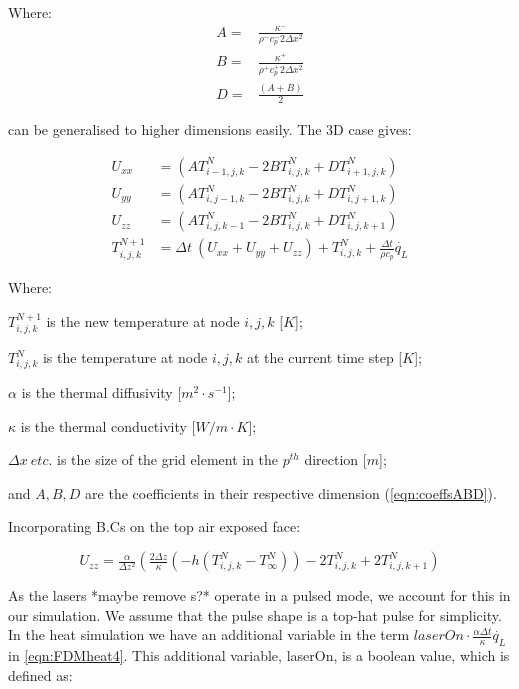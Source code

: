 Where:
\begin{align}
A=&\frac{\kappa^{-}}{\rho^{-}c_{p}^{-}2\Delta x^2} \nonumber \\
B=&\frac{\kappa^{+}}{\rho^{+}c_{p}^{+}2\Delta x^2} \label{eqn:coeffsABD}\\
D=&\frac{(A+B)}{2} \nonumber
\end{align}

 can be generalised to higher dimensions easily. The 3D case gives:

\begin{align}
U_{xx} &=  (A T^N_{i-1,j,k} - 2B T^N_{i,j,k} + D T^N_{i+1,j,k}) \label{eqn:FDMheat1}\\
U_{yy} &=  (A T^N_{i,j-1,k} - 2B T^N_{i,j,k} + D T^N_{i,j+1,k}) \label{eqn:FDMheat2}\\
U_{zz} &=  (A T^N_{i,j,k-1} - 2B T^N_{i,j,k} + D T^N_{i,j,k+1}) \label{eqn:FDMheat3}\\
T^{N+1}_{i,j,k} &= \Delta t\ (U_{xx} + U_{yy} + U_{zz}) + T^{N}_{i,j,k} + \tfrac{\Delta t}{\rho c_p}\dot{q_L} \label{eqn:FDMheat4}
\end{align}

\noindent Where:

	\indent $T^{N+1}_{i,j,k}$ is the new temperature at node $i,j,k$ [$K$];
	
	\indent $T^N_{i,j,k}$ is the temperature at node $i,j,k$ at the current time step [$K$];
	
	\indent $\alpha$ is the thermal diffusivity [$m^2\cdot s^{-1}$];
	
	\indent $\kappa$ is the thermal conductivity [$W/m\cdot K$];
	
	\indent $\Delta x\ etc.$ is the size of the grid element in the $p^{th}$ direction [$m$];
	
	\indent and $A, B,D$ are the coefficients in their respective dimension (\cref{eqn:coeffsABD}).

	\medskip
	
Incorporating B.Cs on the top air exposed face:

\begin{equation}
U_{zz} = \tfrac{\alpha}{\Delta z^2} (\tfrac{2 \Delta z}{\kappa} (-h(T^N_{i,j,k}-T^N_\infty) ) -2 T^N_{i,j,k} + 2T^N_{i,j,k+1}) 
\end{equation}

As the lasers *maybe remove s?* operate in a pulsed mode, we account for this in our simulation. We assume that the pulse shape is a top-hat pulse for simplicity. In the heat simulation we have an additional variable in the term $laserOn\cdot\tfrac{\alpha \Delta t}{\kappa}\dot{q_L}$ in \cref{eqn:FDMheat4}. This additional variable, laserOn, is a boolean value, which is defined as:

